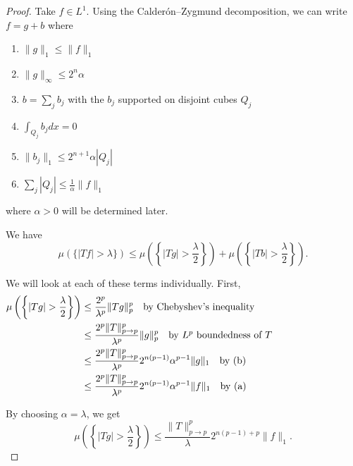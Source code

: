 \documentclass[a4paper]{article}
\begin{document}
\begin{enumerate}
  \begin{proof}

    Take $f \in L^1$. Using the Calder\'{o}n--Zygmund decomposition, we can write $f = g+b$ where
    \begin{enumerate}
      \item $\|g\|_1 \leq \|f\|_1$
      \item $ \|g\|_\infty \leq 2^{n} \alpha$
      \item $b = \sum_j b_j$ with the $b_j$ supported on disjoint cubes $Q_j$
      \item $\int_{Q_j}^{}b_j dx = 0$
      \item $\| b_j \|_1 \leq 2^{n+1}\alpha |Q_j|$
      \item $ \sum_j |Q_j| \leq \frac{1}{\alpha} \| f \|_1$
    \end{enumerate}
    where $\alpha > 0$ will be determined later.

    We have
    \[ \mu \left( \{ |Tf| > \lambda \} \right) \leq \mu \left( \left\{ |Tg| > \frac{\lambda}{2} \right\} \right) + \mu \left( \left\{ |Tb| >
      \frac{\lambda}{2} \right\} \right) .\]

    We will look at each of these terms individually. First,
    \begin{align*}
      \mu\left( \left\{ |Tg| > \frac{\lambda}{2} \right\} \right) &\leq \frac{2^p}{\lambda^p} \|Tg\|_p^p \quad \parbox{5cm}{by Chebyshev's inequality}
      \\
      &\leq \frac{2^p \|T\|_{p \to p}^p}{\lambda^p} \|g\|_p^p \quad \parbox{5cm}{by $L^p$ boundedness of $T$} \\
      &\leq \frac{2^p \|T\|_{p \to p}^p}{\lambda^p} 2^{n(p-1)} \alpha^{p-1} \|g\|_1 \quad \parbox{5cm}{by (b)} \\
      &\leq \frac{2^p \|T\|_{p \to p}^p}{\lambda^p} 2^{n(p-1)} \alpha^{p-1} \|f\|_1 \quad \parbox{5cm}{by (a)}
    \end{align*}

    By choosing $\alpha = \lambda$, we get
    \[ \mu \left( \left\{ |Tg| > \frac{\lambda}{2} \right\} \right) \leq \frac{\|T\|_{p \to p}^p}{\lambda} 2^{n(p-1) + p} \|f\|_1 .\]


\end{proof}
\end{enumerate}
\end{document}
